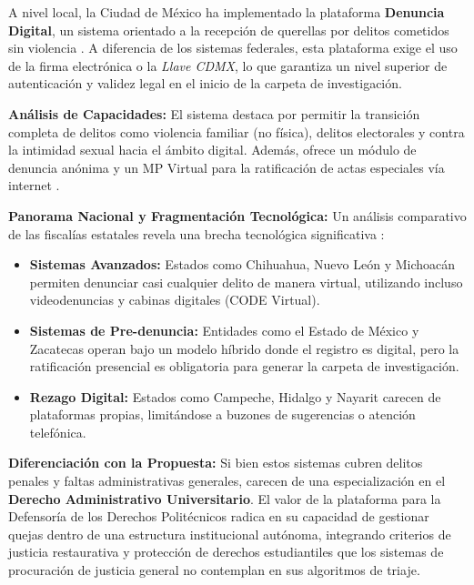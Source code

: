 \begin{flushleft}
\justifying
A nivel local, la Ciudad de México ha implementado la plataforma \textbf{Denuncia Digital}, un sistema orientado a la recepción de querellas por delitos cometidos sin violencia \cite{9}. A diferencia de los sistemas federales, esta plataforma exige el uso de la firma electrónica o la \textit{Llave CDMX}, lo que garantiza un nivel superior de autenticación y validez legal en el inicio de la carpeta de investigación.

\textbf{Análisis de Capacidades:}
El sistema destaca por permitir la transición completa de delitos como violencia familiar (no física), delitos electorales y contra la intimidad sexual hacia el ámbito digital. Además, ofrece un módulo de denuncia anónima y un MP Virtual para la ratificación de actas especiales vía internet \cite{10}. 

\textbf{Panorama Nacional y Fragmentación Tecnológica:}
Un análisis comparativo de las fiscalías estatales revela una brecha tecnológica significativa \cite{10}:
\begin{itemize}
    \item \textbf{Sistemas Avanzados:} Estados como Chihuahua, Nuevo León y Michoacán permiten denunciar casi cualquier delito de manera virtual, utilizando incluso videodenuncias y cabinas digitales (CODE Virtual).
    \item \textbf{Sistemas de Pre-denuncia:} Entidades como el Estado de México y Zacatecas operan bajo un modelo híbrido donde el registro es digital, pero la ratificación presencial es obligatoria para generar la carpeta de investigación.
    \item \textbf{Rezago Digital:} Estados como Campeche, Hidalgo y Nayarit carecen de plataformas propias, limitándose a buzones de sugerencias o atención telefónica.
\end{itemize}

\textbf{Diferenciación con la Propuesta:}
Si bien estos sistemas cubren delitos penales y faltas administrativas generales, carecen de una especialización en el \textbf{Derecho Administrativo Universitario}. El valor de la plataforma para la Defensoría de los Derechos Politécnicos radica en su capacidad de gestionar quejas dentro de una estructura institucional autónoma, integrando criterios de justicia restaurativa y protección de derechos estudiantiles que los sistemas de procuración de justicia general no contemplan en sus algoritmos de triaje.
\end{flushleft}

